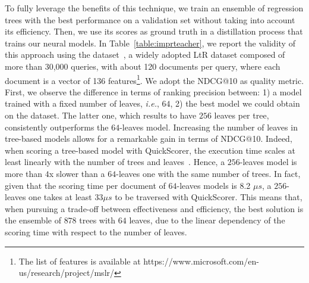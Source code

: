 To fully leverage the benefits of this technique, we train an ensemble of regression trees with the best performance on a validation set without taking into account its efficiency. Then, we use its scores as ground truth in a distillation process that trains our neural models. In Table~\ref{table:imprteacher}, we report the validity of this approach using the \msn dataset~\cite{DBLP:journals/corr/QinL13}, a widely adopted LtR dataset composed of more than 30,000 queries, with about 120 documents per query, where 
each document is a vector of 136 features\footnote{The list of features is available at https://www.microsoft.com/en-us/research/project/mslr/}. We adopt the NDCG@10 as quality metric. First, we observe the difference in terms of ranking precision between: 1) a model trained with a fixed number of leaves, \textit{i.e.}, $64$, 2) the best model we could obtain on the \msn dataset. The latter one, which results to have $256$ leaves per tree, consistently outperforms the $64$-leaves model.
Increasing the number of leaves in tree-based models allows for a remarkable gain in terms of NDCG@10. Indeed, when scoring a tree-based model with QuickScorer, the execution time scales at least linearly with the number of trees and leaves~\cite{lucchese2015quickscorer,dato2016fast}. Hence, a $256$-leaves model is more than $4$x slower than a $64$-leaves one with the same number of trees. 
In fact, given that the scoring time per document of $64$-leaves models is 8.2 $\mu s$, a $256$-leaves one takes at least $33 \mu s$ to be traversed with QuickScorer.
This means that, when pursuing a trade-off between effectiveness and efficiency, the best solution is the ensemble of $878$ trees with $64$ leaves, due to the linear dependency of the scoring time with respect to the number of leaves. 

